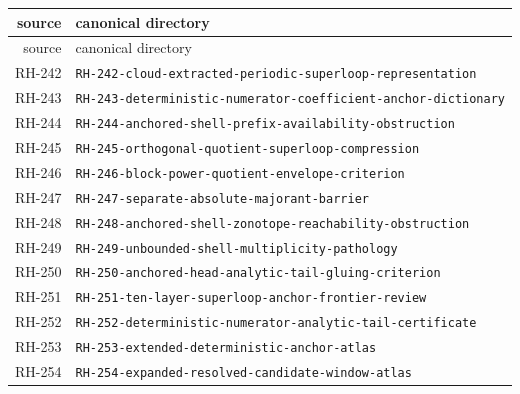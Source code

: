 \begin{longtable}{r >{\raggedright\arraybackslash}p{}}
\toprule
source & canonical directory\\
\midrule
\endfirsthead
\toprule
source & canonical directory\\
\midrule
\endhead
RH-242 & \texttt{RH-\allowbreak{}242-\allowbreak{}cloud-\allowbreak{}extracted-\allowbreak{}periodic-\allowbreak{}superloop-\allowbreak{}representation}\\
RH-243 & \texttt{RH-\allowbreak{}243-\allowbreak{}deterministic-\allowbreak{}numerator-\allowbreak{}coefficient-\allowbreak{}anchor-\allowbreak{}dictionary}\\
RH-244 & \texttt{RH-\allowbreak{}244-\allowbreak{}anchored-\allowbreak{}shell-\allowbreak{}prefix-\allowbreak{}availability-\allowbreak{}obstruction}\\
RH-245 & \texttt{RH-\allowbreak{}245-\allowbreak{}orthogonal-\allowbreak{}quotient-\allowbreak{}superloop-\allowbreak{}compression}\\
RH-246 & \texttt{RH-\allowbreak{}246-\allowbreak{}block-\allowbreak{}power-\allowbreak{}quotient-\allowbreak{}envelope-\allowbreak{}criterion}\\
RH-247 & \texttt{RH-\allowbreak{}247-\allowbreak{}separate-\allowbreak{}absolute-\allowbreak{}majorant-\allowbreak{}barrier}\\
RH-248 & \texttt{RH-\allowbreak{}248-\allowbreak{}anchored-\allowbreak{}shell-\allowbreak{}zonotope-\allowbreak{}reachability-\allowbreak{}obstruction}\\
RH-249 & \texttt{RH-\allowbreak{}249-\allowbreak{}unbounded-\allowbreak{}shell-\allowbreak{}multiplicity-\allowbreak{}pathology}\\
RH-250 & \texttt{RH-\allowbreak{}250-\allowbreak{}anchored-\allowbreak{}head-\allowbreak{}analytic-\allowbreak{}tail-\allowbreak{}gluing-\allowbreak{}criterion}\\
RH-251 & \texttt{RH-\allowbreak{}251-\allowbreak{}ten-\allowbreak{}layer-\allowbreak{}superloop-\allowbreak{}anchor-\allowbreak{}frontier-\allowbreak{}review}\\
RH-252 & \texttt{RH-\allowbreak{}252-\allowbreak{}deterministic-\allowbreak{}numerator-\allowbreak{}analytic-\allowbreak{}tail-\allowbreak{}certificate}\\
RH-253 & \texttt{RH-\allowbreak{}253-\allowbreak{}extended-\allowbreak{}deterministic-\allowbreak{}anchor-\allowbreak{}atlas}\\
RH-254 & \texttt{RH-\allowbreak{}254-\allowbreak{}expanded-\allowbreak{}resolved-\allowbreak{}candidate-\allowbreak{}window-\allowbreak{}atlas}\\

\end{longtable}
